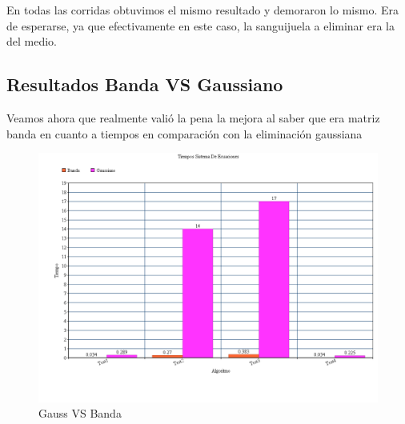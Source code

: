 En todas las corridas obtuvimos el mismo resultado y demoraron lo mismo. Era de esperarse, ya que efectivamente en este caso, la sanguijuela a eliminar era la del medio.

\subsection{Resultados Banda VS Gaussiano}
Veamos ahora que realmente valió la pena la mejora al saber que era matriz banda en cuanto a tiempos en comparación con la eliminación gaussiana

\begin{figure}[htb]
\begin{center}
\includegraphics[scale=0.50]{imagenes/tiemposGaussVsBanda.png} 
\caption{Gauss VS Banda} 
\end{center}
\end{figure}
